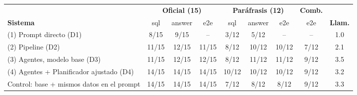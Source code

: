 \begin{tabular}{@{}lcccccccc@{}}
\toprule
& \multicolumn{3}{c}{\textbf{Oficial (15)}} & \multicolumn{3}{c}{\textbf{Paráfrasis (12)}} & \textbf{Comb.} & \\
\cmidrule(lr){2-4}\cmidrule(lr){5-7}
\textbf{Sistema} & sql & answer & e2e & sql & answer & e2e & e2e & \textbf{Llam.} \\
\midrule
(1) Prompt directo (D1) & 8/15 & 9/15 & -- & 3/12 & 5/12 & -- & -- & 1.0 \\
(2) Pipeline (D2) & 11/15 & 12/15 & 11/15 & 8/12 & 10/12 & 10/12 & 7/12 & 2.1 \\
(3) Agentes, modelo base (D3) & 11/15 & 12/15 & 12/15 & 8/12 & 11/12 & 11/12 & 9/12 & 3.5 \\
(4) Agentes + Planificador ajustado (D4) & 14/15 & 14/15 & 14/15 & 10/12 & 10/12 & 10/12 & 9/12 & 3.2 \\
\midrule
Control: base + mismos datos en el prompt & 14/15 & 14/15 & 14/15 & 7/12 & 8/12 & 8/12 & 9/12 & 3.3 \\
\bottomrule
\end{tabular}
